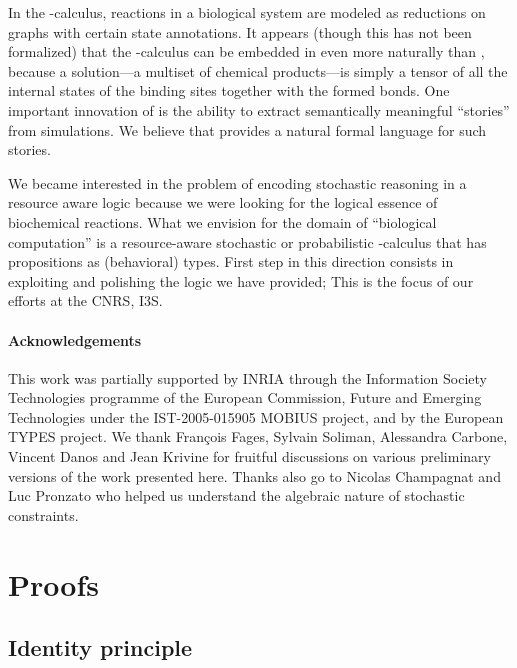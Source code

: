 \documentclass{article}
\begin{document}
\begin{lem}
In the -calculus, reactions in a biological system are
modeled as reductions on graphs with certain state annotations.
It appears (though this has not been formalized)
that the -calculus can be embedded in \hyll even more naturally than
\spi, because a solution---a multiset of chemical products---is simply a tensor
of all the internal states of the binding sites together with the formed
bonds. One important innovation of  is the ability to extract
semantically meaningful ``stories'' from simulations. We believe that \hyll
provides a natural formal language for such stories.

We became interested in the problem of encoding stochastic reasoning in a
resource aware logic because we were looking for the logical essence of
biochemical reactions. What we envision for the domain of ``biological
computation'' is a resource-aware stochastic or probabilistic
-calculus that has \hyll propositions as (behavioral) types.
First step in this direction consists in exploiting and polishing 
the logic we have provided; This is the focus of our efforts at the CNRS, I3S.


\paragraph{Acknowledgements}

This work was partially supported by INRIA through the Information Society Technologies
programme of the European Commission, Future and Emerging Technologies under the
IST-2005-015905 MOBIUS project, and by the European TYPES project.
We thank Fran\c{c}ois Fages, Sylvain Soliman, Alessandra Carbone, Vincent Danos
and Jean Krivine for fruitful discussions on various preliminary versions of the
work presented here.
Thanks also go to Nicolas Champagnat and Luc Pronzato who helped us understand 
the algebraic nature of stochastic constraints.

\bgroup \small


\egroup


\clearpage
\appendix

\section{Proofs}
\label{sec:proofs}

\subsection{Identity principle}
\label{sec:proofs.identity}


\end{lem}
\end{document}
